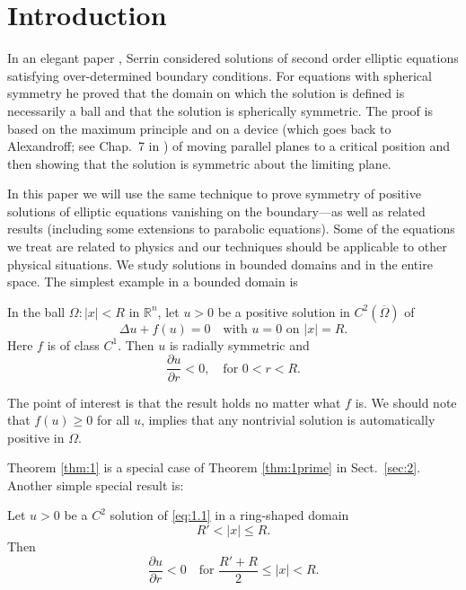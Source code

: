 \section{Introduction}\label{sec:1}

\hspace{1em}In an elegant paper \cite{serrin_symmetry_1971},
Serrin considered solutions of second order elliptic equations satisfying 
over-determined boundary conditions. For equations with spherical symmetry he proved that the 
domain on which the solution is defined is necessarily a ball and that the solution is spherically 
symmetric. The proof is based on the maximum principle and on a device (which goes back to 
Alexandroff; see Chap.~7 in \cite{hopf_differential_2003}) of moving parallel planes 
to a critical position and then showing 
that the solution is symmetric about the limiting plane.

In this paper we will use the same technique to prove symmetry of positive solutions of elliptic 
equations vanishing on the boundary---as well as related results (including some extensions to 
parabolic equations). Some of the equations we treat are related to physics and our techniques 
should be applicable to other physical situations. We study solutions in bounded domains and in 
the entire space. The simplest example in a bounded domain is

\begin{theorem}\label{thm:1}
  In the ball $\Omega: |x|<R$ in $\mathbb{R}^n$, let $u>0$ be a positive solution
  in $C^2(\overline{\Omega})$ of
  \begin{equation}\label{eq:1.1}
    \Delta u + f(u) = 0 \quad \text{with } u=0 \text{ on } |x|=R. 
  \end{equation}
  Here $f$ is of class $C^1$. Then $u$ is radially symmetric and
  \[\frac{\partial u}{\partial r} < 0,\quad \text{for } 0<r<R.\]
\end{theorem}

The point of interest is that the result holds no matter what $f$ is.
We should note that $f(u)\geq 0$ for all $u$,
implies that any nontrivial solution is automatically positive in $\Omega$.

Theorem \ref{thm:1} is a special case of Theorem \ref{thm:1prime} in Sect.~\ref{sec:2}.
Another simple special result is:

\begin{theorem}\label{thm:2}
  Let $u>0$ be a $C^2$ solution of \eqref{eq:1.1} in a ring-shaped domain
  \[R' < |x| \leq R.\]
  Then
  \begin{equation}
    \frac{\partial u}{\partial r} < 0 \quad \text{for } \frac{R'+R}{2}\leq |x| < R.
  \end{equation}
\end{theorem}

